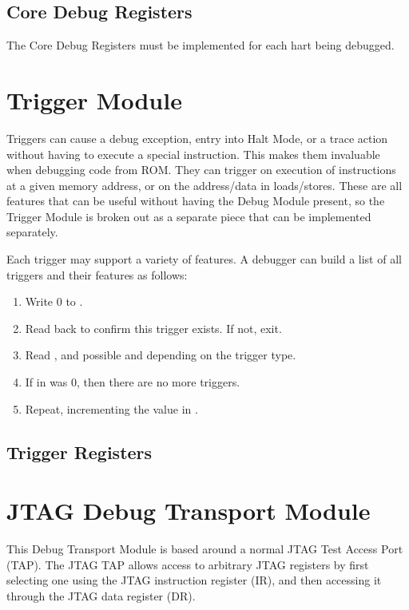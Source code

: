 \documentclass{article}
\newenvironment{steps}[1]
{
   \vspace{1ex}
   \noindent
   #1
   \begin{enumerate}[nosep]
}
{
   \end{enumerate}
   \vspace{1ex}
}
\begin{document}
\subsection{Core Debug Registers} \label{debreg}

The Core Debug Registers must be implemented for each hart being debugged.



\section{Trigger Module}

Triggers can cause a debug exception, entry into Halt Mode, or a trace action
without having to execute a special instruction. This makes them invaluable
when debugging code from ROM. They can trigger on execution of instructions at
a given memory address, or on the address/data in loads/stores.  These are all
features that can be useful without having the Debug Module present, so the
Trigger Module is broken out as a separate piece that can be implemented
separately.

\begin{steps}{Each trigger may support a variety of features. A debugger can
    build a list of all triggers and their features as follows:}
\item Write 0 to \Rtselect.
\item Read back \Rtselect to confirm this trigger exists. If not, exit.
\item Read \Rtdataone, and possible \Rtdatatwo and \Rtdatathree depending on the
    trigger type.
\item If \Ftype in \Rtdataone was 0, then there are no more triggers.
\item Repeat, incrementing the value in \Rtselect.
\end{steps}

\subsection{Trigger Registers}



\section{JTAG Debug Transport Module} \label{jtagdtm}

This Debug Transport Module is based around a normal JTAG Test Access Port
(TAP).  The JTAG TAP allows access to arbitrary JTAG registers by first
selecting one using the JTAG instruction register (IR), and then accessing it
through the JTAG data register (DR).
\end{document}
